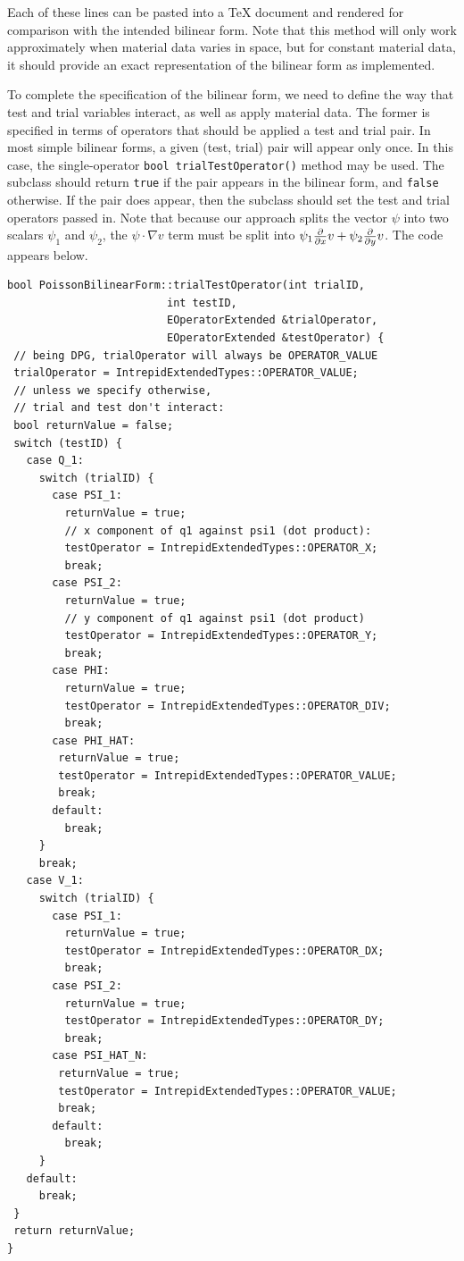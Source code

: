 Each of these lines can be pasted into a TeX document and rendered for comparison with the intended bilinear form.  Note that this method will only work approximately when material data varies in space, but for constant material data, it should provide an exact representation of the bilinear form as implemented.

To complete the specification of the bilinear form, we need to define the way that test and trial variables interact, as well as apply material data.  The former is specified in terms of operators that should be applied a test and trial pair.  In most simple bilinear forms, a given (test, trial) pair will appear only once.  In this case, the single-operator \verb=bool trialTestOperator()= method may be used.  The subclass should return \verb=true= if the pair appears in the bilinear form, and \verb=false= otherwise.  If the pair does appear, then the subclass should set the test and trial operators passed in.  Note that because our approach splits the vector $\psi$ into two scalars $\psi_{1}$ and $\psi_{2}$, the $\psi \cdot \nabla v$ term must be split into $\psi_{1} \NVRpd{}{x} v +  \psi_{2} \NVRpd{}{y} v$.  The code appears below.
\begin{lstlisting}
bool PoissonBilinearForm::trialTestOperator(int trialID, 
                         int testID, 
                         EOperatorExtended &trialOperator, 
                         EOperatorExtended &testOperator) {
 // being DPG, trialOperator will always be OPERATOR_VALUE
 trialOperator = IntrepidExtendedTypes::OPERATOR_VALUE;
 // unless we specify otherwise, 
 // trial and test don't interact:
 bool returnValue = false; 
 switch (testID) {
   case Q_1:
     switch (trialID) {
       case PSI_1:
         returnValue = true;
         // x component of q1 against psi1 (dot product):
         testOperator = IntrepidExtendedTypes::OPERATOR_X;
         break;
       case PSI_2:
         returnValue = true;
         // y component of q1 against psi1 (dot product)
         testOperator = IntrepidExtendedTypes::OPERATOR_Y; 
         break;
       case PHI:
         returnValue = true;
         testOperator = IntrepidExtendedTypes::OPERATOR_DIV;
         break;
       case PHI_HAT:
        returnValue = true;
        testOperator = IntrepidExtendedTypes::OPERATOR_VALUE;
        break;
       default:
         break;
     }
     break;
   case V_1:
     switch (trialID) {
       case PSI_1:
         returnValue = true;
         testOperator = IntrepidExtendedTypes::OPERATOR_DX;
         break;
       case PSI_2:
         returnValue = true;
         testOperator = IntrepidExtendedTypes::OPERATOR_DY;
         break;
       case PSI_HAT_N:
        returnValue = true;
        testOperator = IntrepidExtendedTypes::OPERATOR_VALUE;
        break;
       default:
         break;
     }
   default:
     break;
 }
 return returnValue;    
}
\end{lstlisting}

